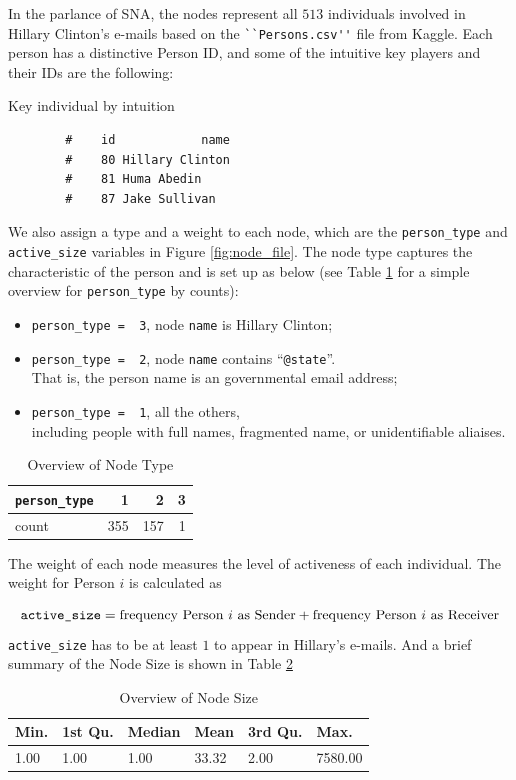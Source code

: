 \documentclass[11pt]{article}
\begin{document}
In the parlance of SNA, the nodes represent all $513$ individuals involved in Hillary Clinton's e-mails based on the \verb+``Persons.csv''+ file from Kaggle. Each person has a distinctive Person ID, and  some of the intuitive key players and their IDs are the following:
\begin{table}[ht]
\caption{Key individual by intuition}
\label{tab:int_key}
\centering
\begin{verbatim}
		#    id            name
		#    80 Hillary Clinton
		#    81 Huma Abedin
		#    87 Jake Sullivan
\end{verbatim}
\end{table}

We also assign a type and a weight to each node, which are the \verb+person_type+ and \verb+active_size+ variables in Figure \ref{fig:node_file}. The node type captures the characteristic of the person and is set up as below (see Table \ref{tab:node_type} for a simple overview for \verb+person_type+ by counts):
\begin{itemize}
\item \verb+person_type =  3+, node \verb+name+ is Hillary Clinton;
\item  \verb+person_type =  2+, node \verb+name+ contains ``\verb+@state+''. \\That is, the person name is an governmental email address;
\item \verb+person_type =  1+, all the others,\\
 including people with full names, fragmented name, or unidentifiable aliaises.
\end{itemize}

\begin{table}[ht]
\caption{Overview of Node Type}
\label{tab:node_type}
\centering
\begin{tabular}{l | r r r}
\verb+person_type+ & 1 & 2&3\\ \hline 
count & 355 & 157 &1
\end{tabular}
\end{table}

The weight of each node measures the level of activeness of each individual. The weight for Person $i$ is calculated as 

\begin{equation} 
\verb+active_size+ = \mbox{frequency Person $i$ as Sender} +  \mbox{frequency Person $i$ as Receiver}
\end{equation}
\verb+active_size+ has to be at least $1$ to appear in Hillary's e-mails. And a brief summary of the Node Size is shown in Table \ref{tab:node_size}
\begin{table}[ht]
\caption{Overview of Node Size}
\label{tab:node_size}
\centering
\begin{tabular}{llllll}
Min. &1st Qu. & Median&    Mean& 3rd Qu.  &  Max. \\ \hline
   1.00 &   1.00  &  1.00&   33.32 &   2.00 &7580.00 
 \end{tabular}
\end{table} 
 
\end{document}
